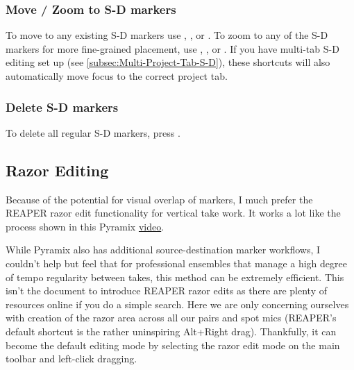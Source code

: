 \documentclass[10pt,american]{article}
\begin{document}
\subsubsection{Move / Zoom to S-D markers}

To move to any existing S-D markers use , ,  or
. To zoom to any of the S-D markers for more fine-grained placement, use
, ,  or . If you have multi-tab S-D editing
set up (see \ref{subsec:Multi-Project-Tab-S-D}), these shortcuts will also
automatically move focus to the correct project tab. 

\subsubsection{Delete S-D markers}

To delete all regular S-D markers, press \keys{\ctrl+\del}.

\subsection{Razor Editing}

Because of the potential for visual overlap of markers, I much prefer the REAPER
razor edit functionality for vertical take work. It works a lot like the process
shown in this Pyramix \href{https://www.youtube.com/watch?v=wQXwnvITQCQ}{video}.

While Pyramix also has additional source-destination marker workflows, I
couldn't help but feel that for professional ensembles that manage a high degree
of tempo regularity between takes, this method can be extremely efficient. This
isn't the document to introduce REAPER razor edits as there are plenty of
resources online if you do a simple search. Here we are only concerning
ourselves with creation of the razor area across all our pairs and spot mics
(REAPER's default shortcut is the rather uninspiring Alt+Right drag).
Thankfully, it can become the default editing mode by selecting the razor edit
mode on the main toolbar and left-click dragging. 
\end{document}
